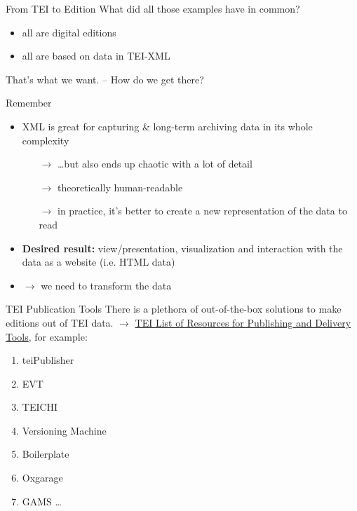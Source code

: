 \begin{frame}{From TEI to Edition}
What did all those examples have in common?
    \begin{itemize}\footnotesize
        \item all are digital editions
        \item all are based on data in TEI-XML
    \end{itemize}

That's what we want. -- How do we get there?

\begin{block}{Remember}
\begin{itemize}\footnotesize
    \item XML is great for capturing \& long-term archiving data in its whole complexity
    \begin{itemize}
        \item[$\to$] \dots but also ends up chaotic with a lot of detail
        \item[$\to$] theoretically human-readable
        \item[$\to$] in practice, it's better to create a new representation of the data to read
    \end{itemize}
    \item \textbf{Desired result: }view/presentation, visualization and interaction with the data as a website (i.e. HTML data)
    \item \alert{$\to$ we need to transform the data}
\end{itemize}
\end{block}

\end{frame}



\begin{frame}{TEI Publication Tools}
There is a plethora of out-of-the-box solutions to make editions out of TEI data. 
$\to$
\alert{\href{https://wiki.tei-c.org/index.php/Category:Publishing_and_delivery_tools}{TEI List of Resources for Publishing and Delivery Tools}}, for example:
\begin{enumerate}
    \item teiPublisher
    \item EVT
    \item TEICHI
    \item Versioning Machine
    \item Boilerplate
    \item Oxgarage
    \item GAMS \dots 
\end{enumerate}

\end{frame}

